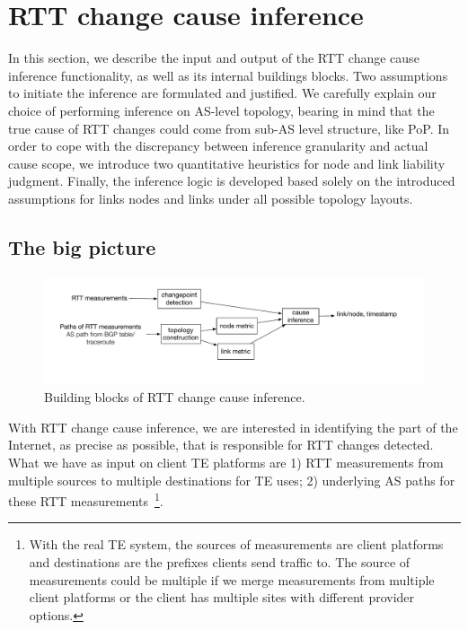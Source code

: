 \section{RTT change cause inference}
\label{sec:inference}
In this section, we describe the input and output of the RTT change cause inference functionality, as well as its internal buildings blocks. 
Two assumptions to initiate the inference are formulated and justified.
We carefully explain our choice of performing inference on AS-level topology, bearing in mind that the true cause of RTT changes could come from sub-AS level structure, like \ac{PoP}.
In order to cope with the discrepancy between inference granularity and actual cause scope, we introduce two quantitative heuristics for node and link liability judgment.
Finally, the inference logic is developed based solely on the introduced assumptions for links nodes and links under all possible topology layouts.

\subsection{The big picture}

\begin{figure}[!htb]
\centering
\includegraphics[width=1.2\textwidth]{gfx/chap5/sys_design.pdf}
\caption{Building blocks of RTT change cause inference.}
\label{fig:chap5_sys_design}
\end{figure}

With RTT change cause inference, we are interested in identifying the part of the Internet, as precise as possible, that is responsible for RTT changes detected. What we have as input on client TE platforms are 1) RTT measurements from multiple sources to multiple destinations for TE uses; 2) underlying AS paths for these RTT measurements~\footnote{With the real TE system, the sources of measurements are client platforms and destinations are the prefixes clients send traffic to. The source of measurements could be multiple if we merge measurements from multiple client platforms or the client has multiple sites with different provider options.}. 

